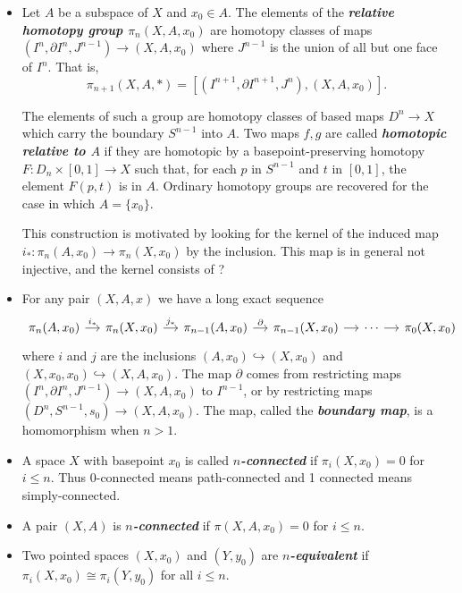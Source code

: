 \documentclass{article}
\numberwithin{equation}{section}
\begin{document}
\begin{defn}
\begin{itemize}
		\item Let $A$ be a subspace of $X$ and $x_0\in A$. The elements of the \textbf{\textit{relative homotopy group $\pi_n(X,A,x_0)$}} are homotopy classes of maps $(I^n,\partial I^n,J^{n-1})\to (X,A,x_0)$ where $J^{n-1}$ is the union of all but one face of $I^n$. That is,
		\[\pi_{n+1}(X,A,*)=[(I^{n+1},\partial I^{n+1},J^n),(X,A,x_0)].\]
		
		The elements of such a group are homotopy classes of based maps $D^n\to X$ which carry the boundary $S^{n-1}$ into $A$. Two maps $f,g$ are called \textbf{\textit{homotopic relative to $A$}} if they are homotopic by a basepoint-preserving homotopy $F:D_n\times[0,1]\to X$ such that, for each $p$ in $S^{n-1}$ and $t$ in $[0,1]$, the element $F(p,t)$ is in $A$. Ordinary homotopy groups are recovered for the case in which $A=\{x_0\}$.
		\begin{remark}
			This construction is motivated by looking for the kernel of the induced map $i_*:\pi_n(A,x_0)\to\pi_n(X,x_0)$ by the inclusion. This map is in general not injective, and the kernel consists of ?
		\end{remark}
		\item For any pair $(X,A,x)$ we have a long exact sequence
		\[\begin{tikzcd}[column sep=small]
			\pi_n(A,x_0)\arrow[r,"i_*"]&\pi_{n}(X,x_0)\arrow[r,"j_*"]&\pi_{n-1}(A,x_0)\arrow[r,"\partial"]&\pi_{n-1}(X,x_0)\arrow[r]&\cdots\arrow[r]&\pi_0(X,x_0)
		\end{tikzcd}\]
		where $i$ and $j$ are the inclusions $(A,x_0)\hookrightarrow(X,x_0)$ and $(X,x_0,x_0)\hookrightarrow(X,A,x_0)$. The map $\partial$ comes from restricting maps $(I^n,\partial I^n,J^{n-1})\to (X,A,x_0)$ to $I^{n-1}$, or by restricting maps $(D^n,S^{n-1},s_0)\to (X,A,x_0)$. The map, called the \textbf{\textit{boundary map}}, is a homomorphism when $n>1$.
		
		\item A space $X$ with basepoint $x_0$ is called \textbf{\textit{$n$-connected}} if $\pi_i(X,x_0)=0$ for $i\leq n$. Thus 0-connected means path-connected and 1 connected means simply-connected.
		
		\item A pair $(X,A)$ is \textbf{\textit{$n$-connected}} if $\pi(X,A,x_0)=0$ for $i\leq n$.
		
		\item Two pointed spaces $(X,x_0)$ and $(Y,y_0)$ are \textbf{\textit{$n$-equivalent}} if $\pi_i(X,x_0)\cong\pi_i(Y,y_0)$ for all $i\leq n$.
	\end{itemize}
\end{defn}
\end{document}
